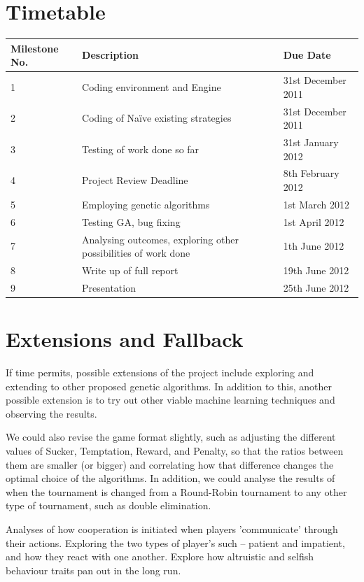 \documentclass{icldt}
\numberwithin{equation}{section}       %
\begin{document}
\section{Timetable}
\label{sect:Timetable}
\begin{center}
    \begin{tabular}{ | l | p{8cm} | l |}
    \hline
    \textbf{Milestone No.} & \textbf{Description} & \textbf{Due Date} \\ \hline
    1 & Coding environment and Engine & 31st December 2011 \\ \hline
    2 & Coding of Naïve existing strategies & 31st December 2011\\ \hline
    3 & Testing of work done so far & 31st January 2012\\ \hline
    4 & Project Review Deadline	 & 8th February 2012\\ \hline
    5 & Employing genetic algorithms & 1st March 2012\\ \hline
    6 & Testing GA, bug fixing & 1st April 2012\\ \hline
    7 & Analysing outcomes, exploring other possibilities of work done & 1th June 2012\\ \hline
    8 & Write up of full report & 19th June 2012\\ \hline
    9 & Presentation & 25th June 2012\\ \hline
    \end{tabular}
\end{center}

\section{Extensions and Fallback}
\label{sect:Extensions and Fallback}
If time permits, possible extensions of the project include exploring and extending to other proposed genetic algorithms. In addition to this, another possible extension is to try out other viable machine learning techniques and observing the results.

We could also revise the game format slightly, such as adjusting the different values of Sucker, Temptation, Reward, and Penalty, so that the ratios between them are smaller (or bigger) and correlating how that difference changes the optimal choice of the algorithms. In addition, we could analyse the results of when the tournament is changed from a Round-Robin tournament to any other type of tournament, such as double elimination.

Analyses of how cooperation is initiated when players 'communicate' through their actions. Exploring the two types of player's such – patient and impatient, and how they react with one another. Explore how altruistic and selfish behaviour traits pan out in the long run.
\end{document}
